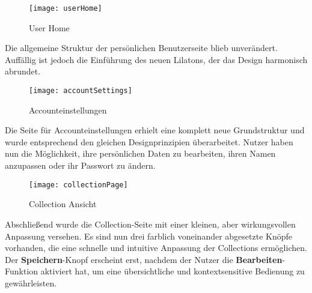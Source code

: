 \begin{figure}[h]
    \centering
    \texttt{[image: userHome]}
    \caption{User Home}
    \label{fig:userHome}
\end{figure}

Die allgemeine Struktur der persönlichen Benutzerseite blieb unverändert.
Auffällig ist jedoch die Einführung des neuen Lilatons, der das Design harmonisch abrundet.

\begin{figure}[h]
    \centering
    \texttt{[image: accountSettings]}
    \caption{Accounteinstellungen}
    \label{fig:accountSettings}
\end{figure}

Die Seite für Accounteinstellungen erhielt eine komplett neue Grundstruktur und wurde entsprechend den gleichen Designprinzipien überarbeitet.
Nutzer haben nun die Möglichkeit, ihre persönlichen Daten zu bearbeiten, ihren Namen anzupassen oder ihr Passwort zu ändern.

\begin{figure}[h]
    \centering
    \texttt{[image: collectionPage]}
    \caption{Collection Ansicht}
    \label{fig:collectionPage}
\end{figure}

Abschließend wurde die Collection-Seite mit einer kleinen, aber wirkungsvollen Anpassung versehen.
Es sind nun drei farblich voneinander abgesetzte Knöpfe vorhanden, die eine schnelle und intuitive Anpassung der Collections ermöglichen.
Der \textbf{Speichern}-Knopf erscheint erst, nachdem der Nutzer die \textbf{Bearbeiten}-Funktion aktiviert hat, um eine übersichtliche und kontextsensitive Bedienung zu gewährleisten.
